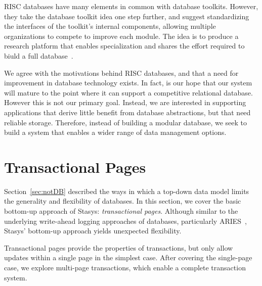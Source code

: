 \documentclass[letterpaper,twocolumn,10pt]{article}
\newcommand{\yad}{Stasys\xspace}
\newcommand{\yads}{Stasys'\xspace}
\begin{document}
RISC databases have many elements in common with
database toolkits.  However, they take the database toolkit idea one
step further, and suggest standardizing the interfaces of the
toolkit's internal components, allowing multiple organizations to
compete to improve each module.  The idea is to produce a research
platform that enables specialization and shares the effort required to biuld a full database~\cite{riscDB}.

We agree with the motivations behind RISC databases, and that a need
for improvement in database technology exists.  In fact, is our hope
that our system will mature to the point where it can support
a competitive relational database.  However this is
not our primary goal.  
Instead, we are interested in supporting applications that derive
little benefit from database abstractions, but that need reliable
storage.  Therefore, instead of building a modular database, we seek
to build a system that enables a wider range of data management options.





\section{Transactional Pages}

Section~\ref{sec:notDB} described the ways in which a top-down data model
limits the generality and flexibility of databases.  In this section,
we cover the basic bottom-up approach of \yad: {\em transactional
pages}. Although similar to the underlying write-ahead logging
approaches of databases, particularly ARIES~\cite{aries}, \yads
bottom-up approach yields unexpected flexibility.

Transactional pages provide the properties of transactions, but
only allow updates within a single page in the simplest case.  After
covering the single-page case, we explore multi-page transactions,
which enable a complete transaction system.
\end{document}

